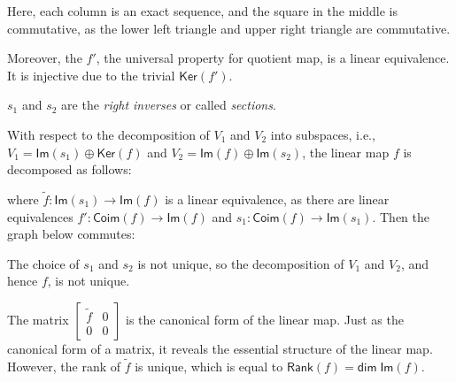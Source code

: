 \documentclass[
	11pt, %
	fleqn, %
	a4paper, %
]{LegrandOrangeBook}
\renewcommand{\ker}[1]{\mathsf{Ker}(#1)} %
\renewcommand{\Im}[1]{\mathsf{Im}(#1)} %
\newcommand{\rank}[1]{\mathsf{Rank}(#1)} %
\newcommand{\coim}[1]{\mathsf{Coim}(#1)} %
\renewcommand{\dim}{\mathsf{dim\;}} %
\begin{document}
Here, each column is an exact sequence, and the square in the middle is commutative, as the lower left triangle and upper right triangle are commutative.

Moreover, the $f'$, the universal property for quotient map, is a linear equivalence. It is injective due to the trivial $\ker{f'}$. 

$s_1$ and $s_2$ are the \emph{right inverses} or called \emph{sections}.

With respect to the decomposition of $V_1$ and $V_2$ into subspaces, i.e., $V_1 = \Im{s_1} \oplus \ker{f}$ and $V_2 = \Im{f} \oplus \Im{s_2}$, the linear map $f$ is decomposed as follows:
\begin{center}
\end{center}
where $\tilde{f} : \Im{s_1} \to \Im{f}$ is a linear equivalence, as there are linear equivalences $f' : \coim{f} \to \Im{f}$ and $s_1 : \coim{f} \to \Im{s_1}$. Then the graph below commutes:

\begin{center}
\end{center}

\begin{remark}
    The choice of $s_1$ and $s_2$ is not unique, so the decomposition of $V_1$ and $V_2$, and hence $f$, is not unique.
\end{remark}

The matrix $\begin{bmatrix}
    \tilde{f} & 0 \\
    0 & 0
\end{bmatrix}$ is the canonical form of the linear map. Just as the canonical form of a matrix, it reveals the essential structure of the linear map. However, the rank of $\tilde{f}$ is unique, which is equal to $\rank{f} = \dim{\Im{f}}$.
\end{document}
